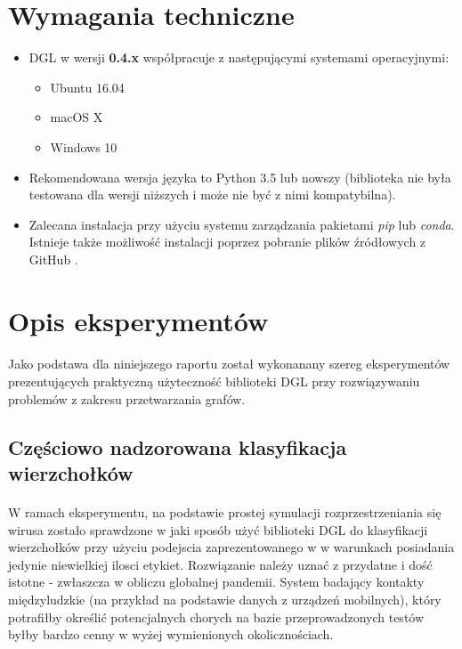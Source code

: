 \documentclass{article}
\begin{document}
\section{Wymagania techniczne}
\label{sec:dgl_system_requirements}
\begin{itemize}
\item
DGL w wersji \textbf{0.4.x} współpracuje z następującymi systemami operacyjnymi:
\begin{itemize}
  \item
    Ubuntu 16.04    
  \item
    macOS X
  \item
   Windows 10
 \end{itemize}
\item
Rekomendowana wersja języka to Python 3.5 lub nowszy (biblioteka nie była testowana dla wersji niższych i może nie być z nimi kompatybilna). 
\item
Zalecana instalacja przy użyciu systemu zarządzania pakietami \textit{pip} lub \textit{conda}. Istnieje także możliwość instalacji poprzez pobranie plików źródłowych z GitHub \cite{dgl_sources}.
 \end{itemize}


\section{Opis eksperymentów}
\label{sec:experiments}
\paragraph{}
Jako podstawa dla niniejszego raportu został wykonanany szereg eksperymentów prezentujących praktyczną użyteczność biblioteki DGL \cite{dgl} przy rozwiązywaniu problemów z zakresu przetwarzania grafów.

\subsection{Częściowo nadzorowana klasyfikacja wierzchołków}
\paragraph{}
W ramach eksperymentu, na podstawie prostej symulacji rozprzestrzeniania się wirusa zostało sprawdzone w jaki sposób użyć biblioteki DGL \cite{dgl} do klasyfikacji wierzchołków przy użyciu podejscia zaprezentowanego w \cite{gcn} w warunkach posiadania jedynie niewielkiej ilosci etykiet. Rozwiązanie należy uznać z przydatne i dość istotne - zwłaszcza w obliczu globalnej pandemii. System badający kontakty międzyludzkie (na przykład na podstawie danych z urządzeń mobilnych), który potrafiłby określić potencjalnych chorych na bazie przeprowadzonych testów byłby bardzo cenny w wyżej wymienionych okolicznościach.
\end{document}
